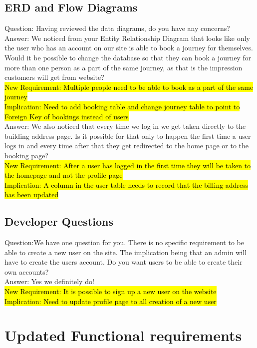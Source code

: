 \documentclass{article}
\begin{document}
\subsection{ERD and Flow Diagrams}
Question: Having reviewed the data diagrams, do you have any concerns?
\\
Answer: We noticed from your Entity Relationship Diagram that looks like only the user who has an account on our site is able to book a journey for themselves. Would it be possible to change the database so that they can book a journey for more than one person as a part of the same journey, as that is the impression customers will get from website?
\\
\hl{New Requirement: Multiple people need to be able to book as a part of the same journey
\\
Implication: Need to add booking table and change journey table to point to Foreign Key of bookings instead of users}
\\
Answer: We also noticed that every time we log in we get taken directly to the building address page. Is it possible for that only to happen the first time a user logs in and every time after that they get redirected to the home page or to the booking page?
\\
\hl{New Requirement: After a user has logged in the first time they will be taken to the homepage and not the profile page 
\\
Implication: A column in the user table needs to record that the billing address has been updated}
\\
\subsection{Developer Questions}
Question:We have one question for you. There is no specific requirement to be able to create a new user on the site. The implication being that an admin will have to create the users account. Do you want users to be able to create their own accounts?
\\
Answer: Yes we definitely do!
\\
\hl{New Requirement: It is possible to sign up a new user on the website 
\\
Implication: Need to update profile page to all creation of a new user}
\\

\section{Updated Functional requirements}
\end{document}
